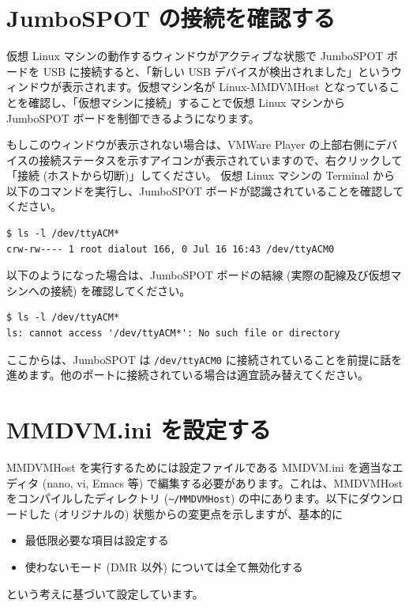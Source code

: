 \documentclass[a4j,oneside]{ujbook}
\begin{document}
\section{JumboSPOT の接続を確認する}

仮想 Linux マシンの動作するウィンドウがアクティブな状態で JumboSPOT ボードを USB に接続すると、「新しい USB デバイスが検出されました」というウィンドウが表示されます。仮想マシン名が Linux-MMDVMHost となっていることを確認し、「仮想マシンに接続」することで仮想 Linux マシンから JumboSPOT ボードを制御できるようになります。

もしこのウィンドウが表示されない場合は、VMWare Player の上部右側にデバイスの接続ステータスを示すアイコンが表示されていますので、右クリックして「接続 (ホストから切断)」してください。
仮想 Linux マシンの Terminal から以下のコマンドを実行し、JumboSPOT ボードが認識されていることを確認してください。

\begin{verbatim}
$ ls -l /dev/ttyACM*
crw-rw---- 1 root dialout 166, 0 Jul 16 16:43 /dev/ttyACM0
\end{verbatim}

以下のようになった場合は、JumboSPOT ボードの結線 (実際の配線及び仮想マシンへの接続) を確認してください。

\begin{verbatim}
$ ls -l /dev/ttyACM*
ls: cannot access '/dev/ttyACM*': No such file or directory
\end{verbatim}

ここからは、JumboSPOT は \verb+/dev/ttyACM0+ に接続されていることを前提に話を進めます。他のポートに接続されている場合は適宜読み替えてください。

\section{MMDVM.ini を設定する}

MMDVMHost を実行するためには設定ファイルである MMDVM.ini を適当なエディタ (nano, vi, Emacs 等) で編集する必要があります。これは、MMDVMHost をコンパイルしたディレクトリ (\verb+~/MMDVMHost+) の中にあります。以下にダウンロードした (オリジナルの) 状態からの変更点を示しますが、基本的に
\begin{itemize}
 \item 最低限必要な項目は設定する
 \item 使わないモード (DMR 以外) については全て無効化する
\end{itemize}
という考えに基づいて設定しています。
\end{document}
